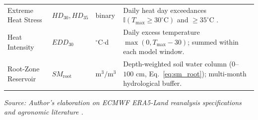 \begin{table}[htbp]
\begin{tabularx}{\textwidth}{p{2.4cm} p{2.6cm} p{1.3cm} >{\raggedright\arraybackslash}X}
Extreme Heat Stress & $HD_{30}, HD_{35}$ & binary & Daily heat day exceedances $\mathbb{I}(T_{\text{max}} \ge 30^\circ\text{C})$ and $\ge 35^\circ\text{C}$ \citep{Schlenker2009}. \\
{Heat Intensity} & {$EDD_{30}$} & {$^\circ$C$\cdot$d} & {Daily excess temperature $\max(0,T_{\text{max}}-30)$; summed within each model window.} \\
Root-Zone Reservoir & $SM_{\text{root}}$ & $\text{m}^3/\text{m}^3$ & Depth-weighted soil water column ($0$--$100\text{ cm}$, Eq.~\eqref{eq:sm_root}); multi-month hydrological buffer. \\
\bottomrule
\end{tabularx}
\vspace{0.2em}
{\footnotesize \textit{Source: Author's elaboration on ECMWF ERA5-Land reanalysis specifications and agronomic literature \citep{Allen1998, Schlenker2009}.}}
\end{table}
